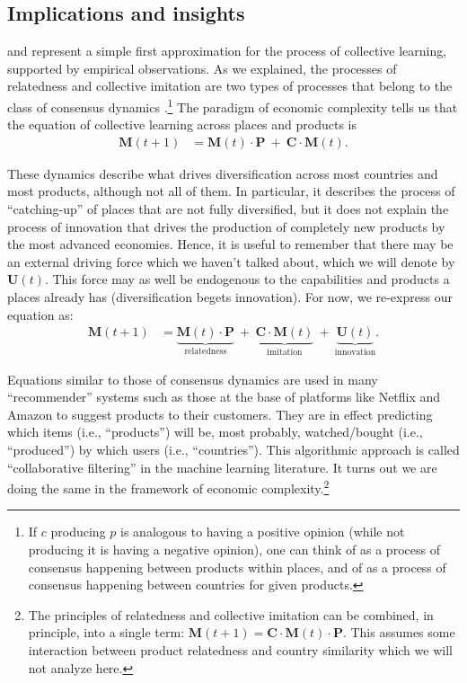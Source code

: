 \documentclass[12pt]{article}
\newcommand{\mtx}[1]{\mathbf{ #1}}
\begin{document}

\subsection{Implications and insights}
 and  represent a simple first approximation for the process of collective learning, supported by empirical observations. As we explained, the processes of relatedness and collective imitation are two types of processes that belong to the class of consensus dynamics \citep{degroot1974reaching}.\footnote{If $c$ producing $p$ is analogous to having a positive opinion (while not producing it is having a negative opinion), one can think of  as a process of consensus happening between products within places, and of  as a process of consensus happening between countries for given products.} The paradigm of economic complexity tells us that the equation of collective learning across places and products is
\begin{align}
	\mtx{M}(t+1) &= \mtx{M}(t)\cdot \mtx{P} ~ + ~ \mtx{C}\cdot\mtx{M}(t).
\label{eq_collectivelearning}
\end{align}

These dynamics describe what drives diversification across most countries and most products, although not all of them. In particular, it describes the process of ``catching-up'' of places that are not fully diversified, but it does not explain the process of innovation that drives the production of completely new products by the most advanced economies. Hence, it is useful to remember that there may be an external driving force which we haven't talked about, which we will denote by $\mtx{U}(t)$. This force may as well be endogenous to the capabilities and products a places already has (diversification begets innovation). For now, we re-express our equation as:
\begin{align}
	\mtx{M}(t+1) &= \underbrace{\mtx{M}(t)\cdot \mtx{P}}_{\text{relatedness}} ~ + ~ \underbrace{\mtx{C}\cdot\mtx{M}(t)}_{\text{imitation}}  ~ + ~ \underbrace{\mtx{U}(t)}_{\text{innovation}}.
\end{align}

Equations similar to those of consensus dynamics are used in many ``recommender'' systems such as those at the base of platforms like Netflix and Amazon to suggest products to their customers. They are in effect predicting which items (i.e., ``products'') will be, most probably, watched/bought (i.e., ``produced'') by which users (i.e., ``countries''). This algorithmic approach is called ``collaborative filtering'' in the machine learning literature. It turns out we are doing the same in the framework of economic complexity.\footnote{The principles of relatedness and collective imitation can be combined, in principle, into a single term: $\mtx{M}(t+1) = \mtx{C}\cdot\mtx{M}(t)\cdot \mtx{P}$. This assumes some interaction between product relatedness and country similarity which we will not analyze here.}
\end{document}
